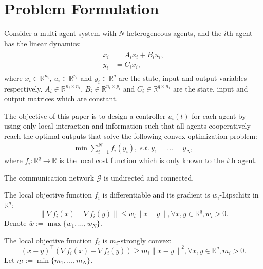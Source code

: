 \documentclass[final,5p,times,twocolumn,authoryear]{elsarticle}
\begin{document}
\section{Problem Formulation}\label{pro}

Consider a multi-agent system with $N$ heterogeneous agents, and the $i$th agent has the linear dynamics:
\begin{align}
	\begin{split}
		{\dot x}_i&=A_i x_i + B_i u_i,\\
		y_i&=C_i x_i,\label{eqsys}
	\end{split}
\end{align}
where $x_i\in\mathbb{R}^{n_i}$, $u_i\in\mathbb{R}^{p_i}$ and $y_i\in\mathbb{R}^{q}$ are the state, input and output variables respectively. $A_i\in\mathbb{R}^{n_i \times n_i}$, $B_i\in\mathbb{R}^{n_i \times p_i}$ and $C_i\in\mathbb{R}^{q \times n_i}$ are the state, input and output matrices which are constant.

The objective of this paper is to design a controller $u_i(t)$ for each agent by using only local interaction and information such that all agents cooperatively reach the optimal outputs that solve the following convex optimization problem:
\begin{align}
	\min\sum_{i=1}^N f_i(y_i),\ s.t.\ y_1=\dots =y_N,\label{eqfun}
\end{align}
where $f_i:\mathbb{R}^{q}\to\mathbb{R}$ is the local cost function which is only known to the $i$th agent.

\begin{assumption} \label{asp1}
	The communication network $\mathcal{G}$ is undirected and connected.	
\end{assumption}

\begin{assumption} \label{asp2}
	The local objective function $f_i$ is differentiable and its gradient is $w_i$-Lipschitz in $\mathbb{R}^{q}$:
	$$\lVert \nabla f_i(x)-\nabla f_i(y)\rVert \leq w_i\lVert x-y\rVert, \forall x,y\in\mathbb{R}^q, w_i>0.$$
	Denote $\overline w := \max\{w_1, \dots, w_N\}$.
\end{assumption}

\begin{assumption} \label{asp3}
	The local objective function $f_i$ is $m_i$-strongly convex:
	$$(x-y)^\top (\nabla f_i(x)-\nabla f_i(y))\ge m_i{\lVert x-y\rVert}^2, \forall x,y\in\mathbb{R}^q, m_i>0.$$
	Let $\underline m := \min\{m_1, \dots, m_N\}$.
\end{assumption}
\end{document}
